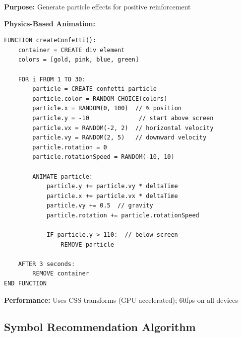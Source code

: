 \documentclass[12pt, a4paper]{article}
\begin{document}
\begin{tcolorbox}[colback=stargold!5, colframe=stargold, title=\textbf{Celebratory Visual Feedback}]

\textbf{Purpose:} Generate particle effects for positive reinforcement

\textbf{Physics-Based Animation:}
\begin{verbatim}
FUNCTION createConfetti():
    container = CREATE div element
    colors = [gold, pink, blue, green]
    
    FOR i FROM 1 TO 30:
        particle = CREATE confetti particle
        particle.color = RANDOM_CHOICE(colors)
        particle.x = RANDOM(0, 100)  // % position
        particle.y = -10              // start above screen
        particle.vx = RANDOM(-2, 2)  // horizontal velocity
        particle.vy = RANDOM(2, 5)   // downward velocity
        particle.rotation = 0
        particle.rotationSpeed = RANDOM(-10, 10)
        
        ANIMATE particle:
            particle.y += particle.vy * deltaTime
            particle.x += particle.vx * deltaTime
            particle.vy += 0.5  // gravity
            particle.rotation += particle.rotationSpeed
            
            IF particle.y > 110:  // below screen
                REMOVE particle
                
    AFTER 3 seconds:
        REMOVE container
END FUNCTION
\end{verbatim}

\textbf{Performance:} Uses CSS transforms (GPU-accelerated); 60fps on all devices

\end{tcolorbox}

\subsection{Symbol Recommendation Algorithm}
\end{document}

